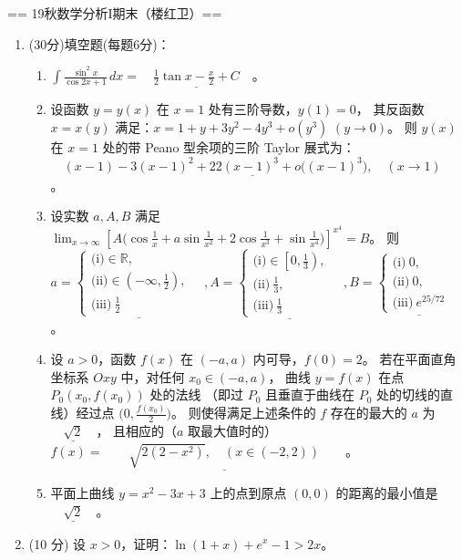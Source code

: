 == 19秋数学分析I期末（楼红卫）==
\begin{enumerate}
\item[一] (30分)填空题(每题6分)：
\begin{enumerate}[label=(\arabic*)]
\item $\displaystyle\int \frac{\sin^{2} x}{\cos 2x+1} \, dx=\underline{\quad \frac{1}{2} \tan x-\frac{x}{2}+C \quad}$。
\item 设函数 $y=y(x)$ 在 $x=1$ 处有三阶导数，$y(1)=0$，
其反函数 $x=x(y)$ 满足：$x=1+y+3y^{2}-4 y^{3}+o(y^{3})$ $(y \rightarrow 0)$。
则 $y(x)$ 在 $x=1$ 处的带 Peano 型余项的三阶 Taylor 展式为：
$\underline{\quad(x-1)-3(x-1)^{2}+22(x-1)^{3}+o\big((x-1)^{3}\big), \quad(x \rightarrow 1)\quad}$。
\item 设实数 $a, A, B$ 满足 $\displaystyle\lim_{x \rightarrow \infty}\left[A\Big(\cos \frac{1}{x}+a\sin\frac{1}{x^{2}}+2\cos\frac{1}{x^{3}}+\sin\frac{1}{x^{4}}\Big)\right]^{x^{4}}=B$。
则 $a=\underline{\begin{cases}\text{(i)}\in\mathbb{R}, \\ \text {(ii)}\in\left(-\infty, \frac{1}{2}\right), \\ \text {(iii)}\ \frac{1}{2}\end{cases} \quad}, 
A=\underline{\begin{cases}\text{(i)}\in\left[0, \frac{1}{3}\right), \\ \text{(ii)}\ \frac{1}{3}, \\ \text{(iii)}\ \frac{1}{3}\end{cases}\quad}, 
B=\underline{\begin{cases}\text{(i)}\ 0, \\ \text{(ii)}\ 0, \\ \text{(iii)}\ e^{25/72}\end{cases}\quad}$。
\item 设 $a>0$，函数 $f(x)$ 在 $(-a, a)$ 内可导，$f(0)=2$。
若在平面直角坐标系 $O x y$ 中，对任何 $x_{0} \in(-a, a)$，
曲线 $y=f(x)$ 在点 $P_{0}(x_{0}, f(x_{0}))$ 处的法线
（即过 $P_{0}$ 且垂直于曲线在 $P_{0}$ 处的切线的直线）经过点 $\big(0, \frac{f(x_{0})}{2}\big)$。
则使得满足上述条件的 $f$ 存在的最大的 $a$ 为 $\underline{\quad\sqrt{2}\quad}$，
且相应的（$a$ 取最大值时的）$f(x)=\underline{\qquad\sqrt{2(2-x^{2})}, \quad(x \in(-2,2))\qquad}$。
\item 平面上曲线 $y=x^{2}-3x+3$ 上的点到原点 $(0,0)$ 的距离的最小值是 $\underline{\quad\sqrt{2}\quad}$。
\end{enumerate}
\item[二] (10 分) 设 $x>0$，证明：$\ln(1+x)+e^{x}-1>2x$。


\end{enumerate}
